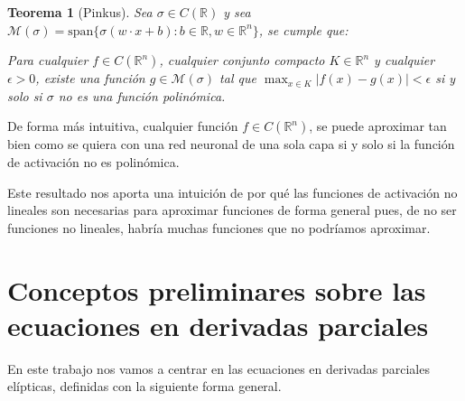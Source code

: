 \documentclass[a4paper,11pt,spanish, twoside, leqno]{tfg-uam}
\newtheorem{teor}{Teorema}[chapter]
\theoremstyle{definition}
\begin{document}
\begin{teor}[Pinkus]
    Sea $\sigma\in C(\mathbb{R})$ y sea $\mathcal{M}(\sigma) = \text{span}\{\sigma(w\cdot x + b): b \in \mathbb{R}, w \in \mathbb{R}^n\}$, se cumple que:
    
    Para cualquier $f \in C(\mathbb{R}^n)$, cualquier conjunto compacto $K\in \mathbb{R}^n$ y cualquier $\epsilon > 0$, existe una función $g\in \mathcal{M}(\sigma)$ tal que $\max_{x\in K}|f(x)-g(x)|<\epsilon$ si y solo si $\sigma$ no es una función polinómica.
\end{teor}
De forma más intuitiva, cualquier función $f \in C(\mathbb{R}^n)$, se puede aproximar tan bien como se quiera con una red neuronal de una sola capa si y solo si la función de activación no es polinómica.

Este resultado nos aporta una intuición de por qué las funciones de activación no lineales son necesarias para aproximar funciones de forma general pues, de no ser funciones no lineales, habría muchas funciones que no podríamos aproximar. 

\section{Conceptos preliminares sobre las ecuaciones en derivadas parciales} \label{sec:EDPs}

En este trabajo nos vamos a centrar en las ecuaciones en derivadas parciales elípticas, definidas con la siguiente forma general.
\end{document}
